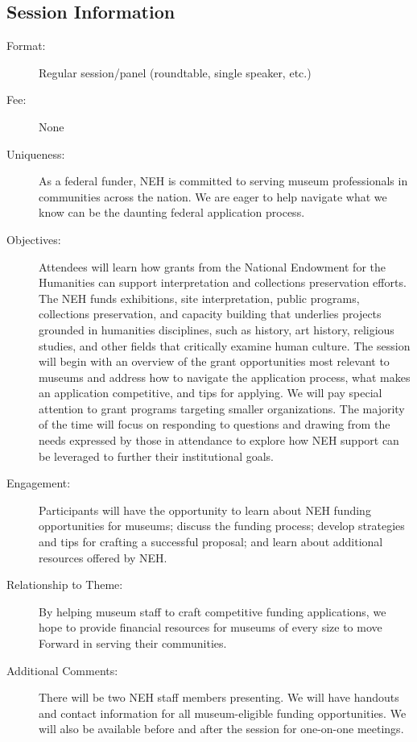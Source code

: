 \documentclass{report}
\begin{document}
              \subsection*{Session Information}
                \begin{description}
                  \item [Format:] Regular session/panel (roundtable, single speaker, etc.)
							    
								  \item [Fee:]None
							     
							    \item [Uniqueness:]As a federal funder, NEH is committed to serving museum professionals in communities across the nation. We are eager to help navigate what we know can be the daunting federal application process.
							    \item [Objectives:]Attendees will learn how grants from the National Endowment for the Humanities can support interpretation and collections preservation efforts. The NEH funds exhibitions, site interpretation, public programs, collections preservation, and capacity building that underlies projects grounded in humanities disciplines, such as history, art history, religious studies, and other fields that critically examine human culture. The session will begin with an overview of the grant opportunities most relevant to museums and address how to navigate the application process, what makes an application competitive, and tips for applying.  We will pay special attention to grant programs targeting smaller organizations. The majority of the time will focus on responding to questions and drawing from the needs expressed by those in attendance to explore how NEH support can be leveraged to further their institutional goals.
							    \item [Engagement:]Participants will have the opportunity to learn about NEH funding opportunities for museums; discuss the funding process; develop strategies and tips for crafting a successful proposal; and learn about additional resources offered by NEH.
							    \item [Relationship to Theme:]By helping museum staff to craft competitive funding applications, we hope to provide financial resources for museums of every size to move Forward in serving their communities.
							    
                    \item [Additional Comments: ]There will be two NEH staff members presenting. We will have handouts and contact information for all museum-eligible funding opportunities. We will also be available before and after the session for one-on-one meetings.

                \end{description}
\end{document}
